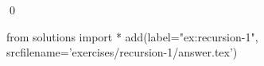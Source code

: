 
\begin{ex} 
  \label{ex:recursion-1}
  
  \qed
\end{ex} 
\begin{python0}
from solutions import *
add(label="ex:recursion-1",
    srcfilename='exercises/recursion-1/answer.tex') 
\end{python0}
